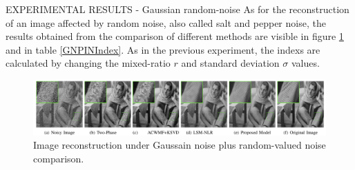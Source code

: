 \begin{frame}{EXPERIMENTAL RESULTS - Gaussian random-noise}
    As for the reconstruction of an image affected by random noise, also 
    called salt and pepper noise, the results obtained from the comparison of 
    different methods are visible in figure \ref{fig:saltComp} and in table \ref{GNPINIndex}. As in the previous 
    experiment, the indexs are calculated by changing the mixed-ratio $r$ and 
    standard deviation $\sigma$ values.
    \begin{figure}[h!]
        \centering
        \includegraphics[width = 0.7\linewidth]{images/paper7/salt.png}
        \centering
        \caption{Image reconstruction under Gaussain noise plus random-valued noise comparison.}
        \label{fig:saltComp}
    \end{figure}
    

\end{frame}
